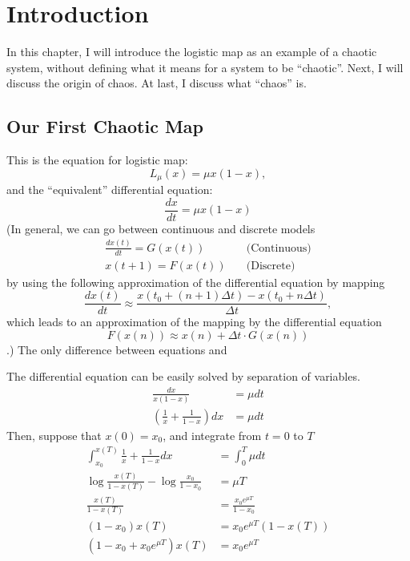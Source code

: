 \documentclass[12pt,twoside,draft]{book}
\begin{document}
\chapter{Introduction}
In this chapter, I will introduce the logistic map as an example of a chaotic system, without defining what it means for a system to be ``chaotic''.
Next, I will discuss the origin of chaos.
At last, I discuss what ``chaos'' is.

\section{Our First Chaotic Map}

This is the equation for logistic map:
\begin{equation}
  L_{\mu}(x) = \mu x(1-x),
  \label{logistic}
\end{equation}
and the ``equivalent'' differential equation:
\begin{equation}
  \frac{dx}{dt} = \mu x(1-x)
  \label{logisticdiffeq}
\end{equation}
(In general, we can go between continuous and discrete models
\begin{align*}
  \frac{dx(t)}{dt} = G(x(t)) &\quad\mbox{(Continuous)} \\
  x(t + 1) = F(x(t)) &\quad\mbox{(Discrete)}
\end{align*}
by using the following approximation of the differential equation by mapping
\begin{equation*}
  \frac{dx(t)}{dt} \approx \frac{x(t_0 + (n+1)\Delta t) - x(t_0 + n \Delta t)}{\Delta t},
\end{equation*}
which leads to an approximation of the mapping by the differential equation
\begin{equation*}
  F(x(n)) \approx x(n) + \Delta t \cdot G(x(n))
\end{equation*}
.)
The only difference between equations  and 

The differential equation  can be easily solved by separation of variables.
\begin{align*}
  \frac{dx}{x(1-x)} &= \mu dt \\  
  \left( \frac{1}{x} + \frac{1}{1-x} \right) dx &= \mu dt
\end{align*}
Then, suppose that $x(0) = x_0$, and integrate from $t = 0$ to $T$
\begin{align*}
  \int_{x_0}^{x(T)} \frac{1}{x} + \frac{1}{1-x} dx &= \int_0^T \mu dt \\
  \log{\frac{x(T)}{1-x(T)}} - \log{\frac{x_0}{1-x_0}} &= \mu T \\
  \frac{x(T)}{1-x(T)} &= \frac{x_0 e^{\mu T}}{1-x_0} \\
  (1-x_0)x(T) &= x_0 e^{\mu T} (1-x(T)) \\
  (1-x_0 + x_0 e^{\mu T})x(T) &= x_0 e^{\mu T}
\end{align*}
\end{document}
